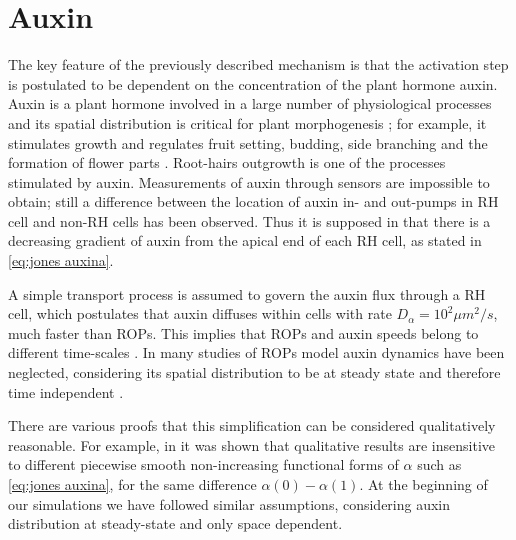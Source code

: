 \section{Auxin}
The key feature of the previously described mechanism is that the activation step is postulated to be dependent on the concentration of the plant hormone auxin. Auxin is a plant hormone involved in a large number of physiological processes and its spatial distribution is critical for plant morphogenesis \cite{vero:auxintrasnport, farcot:14, plant:Mironova}; for example, it stimulates growth and regulates fruit setting, budding, side branching and the formation of flower parts \cite{Vero:31_auxinpolarity, vero:auxintrasnport}. Root-hairs outgrowth is one of the processes stimulated by auxin. Measurements of auxin through sensors are impossible to obtain; still a difference between the location of auxin in- and out-pumps in RH cell and non-RH cells has been observed. Thus it is supposed in \cite{jones} that there is a decreasing gradient of auxin from the apical end of each RH cell, as stated in \eqref{eq:jones auxina}.

A simple transport process is assumed to govern the auxin flux through a RH cell, which postulates that auxin diffuses within cells with rate $D_{\alpha} = 10^2 \mu m^2/s$, much faster than ROPs. This implies that ROPs and auxin speeds belong to different time-scales \cite{plant:Alim}. In many studies of ROPs model auxin dynamics have been neglected, considering its spatial distribution to be at steady state and therefore time independent \cite{intra2, intra1_R, intra:Krup}.

There are various proofs that this simplification can be considered qualitatively reasonable. For example, in \cite{phdthesis:victor} it was shown that qualitative results are insensitive to different piecewise smooth non-increasing functional forms of $\alpha $ such as \eqref{eq:jones auxina}, for the same difference $\alpha(0) - \alpha(1)$. At the beginning of our simulations we have followed similar assumptions, considering auxin distribution at steady-state and only space dependent.


